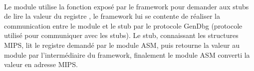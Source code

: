 \documentclass[11pt, book, english, french, standardlists]{upmethodology-document}
\begin{document}
				\paragraph*{}
					Le module utilise la fonction  exposé par le framework pour demander aux stubs de lire la valeur du registre , le framework lui se contente de réaliser la communication entre le module et le stub par le protocole GenDbg (protocole utilisé pour communiquer avec les stubs). Le stub, connaissant les structures MIPS, lit le registre demandé par le module ASM, puis retourne la valeur au module par l'intermédiaire du framework, finalement le module ASM converti la valeur en adresse MIPS.
	\nocite{*}
	
	
	\printglossary[type=\acronymtype,title=Lexique,toctitle=Lexique]{}
		\setcounter{section}{0}
		\renewcommand{\thesection}{\Alph{section}}
		\renewcommand{\theHsection}{appendixsection.\Alph{section}}
\end{document}
